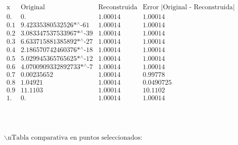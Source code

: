 \documentclass{article}
\begin{document}
\noindent\(\begin{array}{cccc}
 \text{x} & \text{Original} & \text{Reconstruida} & \text{Error $|$Original - Reconstruida$|$} \\
 0. & 0. & 1.00014 & 1.00014 \\
 0.1 & \text{9.42335380532526$\grave{ }$*${}^{\wedge}$-61} & 1.00014 & 1.00014 \\
 0.2 & \text{3.083347537533967$\grave{ }$*${}^{\wedge}$-39} & 1.00014 & 1.00014 \\
 0.3 & \text{6.633715881385892$\grave{ }$*${}^{\wedge}$-27} & 1.00014 & 1.00014 \\
 0.4 & \text{2.186570742460376$\grave{ }$*${}^{\wedge}$-18} & 1.00014 & 1.00014 \\
 0.5 & \text{5.029945365765625$\grave{ }$*${}^{\wedge}$-12} & 1.00014 & 1.00014 \\
 0.6 & \text{4.0700909332892733$\grave{ }$*${}^{\wedge}$-7} & 1.00014 & 1.00014 \\
 0.7 & 0.00235652 & 1.00014 & 0.99778 \\
 0.8 & 1.04921 & 1.00014 & 0.0490725 \\
 0.9 & 11.1103 & 1.00014 & 10.1102 \\
 1. & 0. & 1.00014 & 1.00014 \\
\end{array}\)

\noindent\(\begin{array}{cc}
 
\begin{array}{cc}
  &  \\
\end{array}
 &  \\
\end{array}\)

\noindent\(\text{$\backslash $nTabla comparativa en puntos seleccionados:}\)
\end{document}
